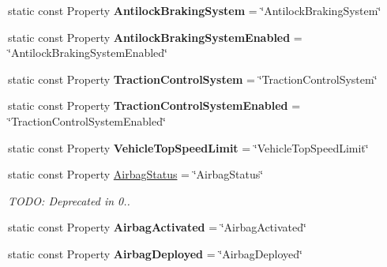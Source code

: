 \begin{DoxyCompactItemize}
\item 
\hypertarget{classVehicleProperty_ab3ed7359914eb1aad8aff1a3409b1f0c}{static const Property {\bfseries Antilock\+Braking\+System} = \char`\"{}Antilock\+Braking\+System\char`\"{}}\label{classVehicleProperty_ab3ed7359914eb1aad8aff1a3409b1f0c}

\item 
\hypertarget{classVehicleProperty_a601acdba0ce5f818794e36ae6f6818ba}{static const Property {\bfseries Antilock\+Braking\+System\+Enabled} = \char`\"{}Antilock\+Braking\+System\+Enabled\char`\"{}}\label{classVehicleProperty_a601acdba0ce5f818794e36ae6f6818ba}

\item 
\hypertarget{classVehicleProperty_a16b20920ac636662cc4accacde1a434f}{static const Property {\bfseries Traction\+Control\+System} = \char`\"{}Traction\+Control\+System\char`\"{}}\label{classVehicleProperty_a16b20920ac636662cc4accacde1a434f}

\item 
\hypertarget{classVehicleProperty_a9bdb20d27ab71b0bd1b26317f4820e78}{static const Property {\bfseries Traction\+Control\+System\+Enabled} = \char`\"{}Traction\+Control\+System\+Enabled\char`\"{}}\label{classVehicleProperty_a9bdb20d27ab71b0bd1b26317f4820e78}

\item 
\hypertarget{classVehicleProperty_aa33a83620bfe2ece493a8e8e7e1fdbcc}{static const Property {\bfseries Vehicle\+Top\+Speed\+Limit} = \char`\"{}Vehicle\+Top\+Speed\+Limit\char`\"{}}\label{classVehicleProperty_aa33a83620bfe2ece493a8e8e7e1fdbcc}

\item 
\hypertarget{classVehicleProperty_a341a783cf4746bb7388ee460e62c309e}{static const Property \hyperlink{classVehicleProperty_a341a783cf4746bb7388ee460e62c309e}{Airbag\+Status} = \char`\"{}Airbag\+Status\char`\"{}}\label{classVehicleProperty_a341a783cf4746bb7388ee460e62c309e}

\begin{DoxyCompactList}\small\item\em T\+O\+D\+O\+: Deprecated in 0.. \end{DoxyCompactList}\item 
\hypertarget{classVehicleProperty_a2b62b1680b692b56ef8e88b7abd1c364}{static const Property {\bfseries Airbag\+Activated} = \char`\"{}Airbag\+Activated\char`\"{}}\label{classVehicleProperty_a2b62b1680b692b56ef8e88b7abd1c364}

\item 
\hypertarget{classVehicleProperty_a1a80daf0feb155b37bf78988e428102b}{static const Property {\bfseries Airbag\+Deployed} = \char`\"{}Airbag\+Deployed\char`\"{}}\label{classVehicleProperty_a1a80daf0feb155b37bf78988e428102b}


\end{DoxyCompactItemize}
